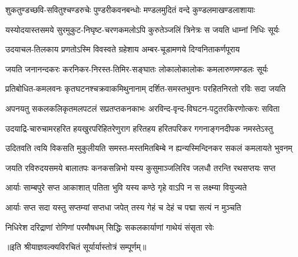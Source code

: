 

\twolineshloka
{शुकतुण्डच्छवि-सवितुश्चण्डरुचेः पुण्डरीकवनबन्धोः}
{मण्डलमुदितं वन्दे कुण्डलमाखण्डलाशायाः}%

\twolineshloka
{यस्योदयास्तसमये सुरमुकुट-निघृष्ट-चरणकमलोऽपि}
{कुरुतेञ्जलिं त्रिनेत्रः स जयति धाम्नां निधिः सूर्यः}%

\twolineshloka
{उदयाचल-तिलकाय प्रणतोऽस्मि विवस्वते ग्रहेशाय}
{अम्बर-चूडामणये दिग्वनिताकर्णपूराय}%

\twolineshloka
{जयति जनानन्दकरः करनिकर-निरस्त-तिमिर-सङ्घातः}
{लोकालोकालोकः कमलारुणमण्डलः सूर्यः}%

\twolineshloka
{प्रतिबोधित-कमलवनः कृतघटनश्चक्रवाकमिथुनानाम्}
{दर्शित-समस्तभुवनः परहितनिरतो रविः सदा जयति}%

\twolineshloka
{अपनयतु सकलकलिकृतमलपटलं सप्रतप्तकनकाभः}
{अरविन्द-वृन्द-विघटन-पटुतरकिरणोत्करः सविता}%

\twolineshloka
{उदयाद्रि-चारुचामरहरित हयखुरपरिहितरेणुराग}
{हरितहय हरितपरिकर गगनाङ्गनदीपक नमस्तेऽस्तु}%

\twolineshloka
{उदितवति त्वयि विकसति मुकुलीयति समस्त-मस्तमितबिम्बे}
{न ह्यन्यस्मिन्दिनकर सकलं कमलायते भुवनम्}%

\twolineshloka
{जयति रविरुदयसमये बालातपः कनकसन्निभो यस्य}
{कुसुमाञ्जलिरिव जलधौ तरन्ति रथसप्तयः सप्त}%

\twolineshloka
{आर्याः साम्बपुरे सप्त आकाशात् पतिता भुवि}
{यस्य कण्ठे गृहे वाऽपि न स लक्ष्म्या वियुज्यते}%

\twolineshloka
{आर्याः सप्त सदा यस्तु सप्तम्यां सप्तधा जपेत्}
{तस्य गेहं च देहं च पद्मा सत्यं न मुञ्चति}%

\twolineshloka
{निधिरेश दरिद्राणां रोगिणां परमौषधम्}
{सिद्धिः सकलकार्याणां गाथेयं संसृता रवेः}%

॥इति श्रीयाज्ञवल्क्यविरचितं सूर्यार्यास्तोत्रं सम्पूर्णम्॥

